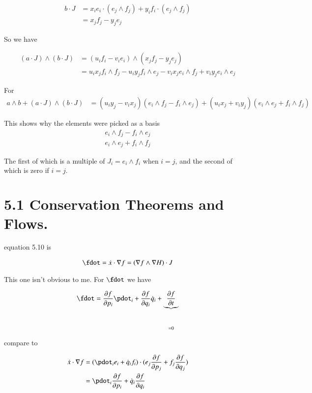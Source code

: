 \begin{align*}
b \cdot J
&=
x_i e_i \cdot ( e_j \wedge f_j )
+ y_i f_i \cdot ( e_j \wedge f_j ) \\
&= x_j f_j - y_j e_j
\end{align*}

So we have

\begin{align*}
(a \cdot J) \wedge (b \cdot J) 
&= (u_i f_i - v_i e_i) \wedge (x_j f_j - y_j e_j) \\
&=
 u_i x_j f_i \wedge f_j 
-u_i y_j f_i \wedge e_j
- v_i x_j e_i \wedge f_j
+ v_i y_j e_i \wedge e_j
\end{align*}

For
\begin{align*}
a \wedge b + (a \cdot J) \wedge (b \cdot J) 
&= 
 ( u_i y_j - v_i x_j ) (e_i \wedge f_j - f_i \wedge e_j)
+ ( u_i x_j + v_i y_j ) (e_i \wedge e_j + f_i \wedge f_j)
\end{align*}

This shows why the elements were picked as a basis
\begin{align*}
e_i \wedge f_j - f_i \wedge e_j
\end{align*}
\begin{align*}
e_i \wedge e_j + f_i \wedge f_j
\end{align*}

The first of which is a multiple of $J_i = e_i \wedge f_i$ when $i=j$, and the second of which is zero if $i=j$.

\section{5.1 Conservation Theorems and Flows. } 

equation 5.10 is

\begin{align*}
\fdot = \xdot \cdot \grad f = (\grad f \wedge \grad H) \cdot J
\end{align*}

This one isn't obvious to me.  For $\fdot$ we have

\begin{align*}
\fdot = \PD{p_i}{f} \pdot_i +\PD{q_i}{f} \qdot_i + \underbrace{\PD{t}{f}}_{=0}
\end{align*}

compare to 

\begin{align*}
\xdot \cdot \grad f 
&= (\pdot_i e_i + \qdot_i f_i) \cdot (e_j \PD{p_j}{f} + f_j \PD{q_j}{f}) \\
&= \pdot_i \PD{p_i}{f} + \qdot_i \PD{q_i}{f}
\end{align*}

